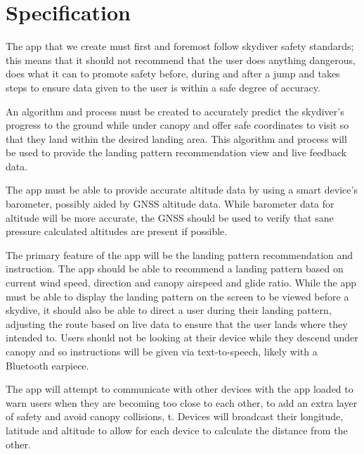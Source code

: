 \documentclass[11pt, a4paper, twocolumn]{article}
\begin{document}
\section{Specification}\label{sec:specification} %

The app that we create must first and foremost follow skydiver safety standards; this means that it should not recommend that the user does anything dangerous, does what it can to promote safety before, during and after a jump and takes steps to ensure data given to the user is within a safe degree of accuracy.

An algorithm and process must be created to accurately predict the skydiver's progress to the ground while under canopy and offer safe coordinates to visit so that they land within the desired landing area. This algorithm and process will be used to provide the landing pattern recommendation view and live feedback data.

The app must be able to provide accurate altitude data by using a smart device's barometer, possibly aided by GNSS altitude data. While barometer data for altitude will be more accurate, the GNSS should be used to verify that sane pressure calculated altitudes are present if possible.

The primary feature of the app will be the landing pattern recommendation and instruction. The app should be able to recommend a landing pattern based on current wind speed, direction and canopy airspeed and glide ratio. While the app must be able to display the landing pattern on the screen to be viewed before a skydive, it should also be able to direct a user during their landing pattern, adjusting the route based on live data to ensure that the user lands where they intended to. Users should not be looking at their device while they descend under canopy and so instructions will be given via text-to-speech, likely with a Bluetooth earpiece.

The app will attempt to communicate with other devices with the app loaded to warn users when they are becoming too close to each other, to add an extra layer of safety and avoid canopy collisions, t. Devices will broadcast their longitude, latitude and altitude to allow for each device to calculate the distance from the other.
\end{document}
